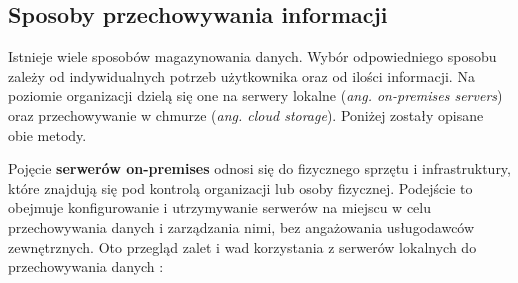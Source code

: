 \documentclass[12pt,a4paper,twoside]{article}
\begin{document}
\subsection{Sposoby przechowywania informacji}
Istnieje wiele sposobów magazynowania danych. Wybór odpowiedniego sposobu zależy od indywidualnych potrzeb użytkownika oraz od ilości informacji. Na poziomie organizacji dzielą się one na serwery lokalne (\textit{ang. on-premises servers}) oraz przechowywanie w chmurze (\textit{ang. cloud storage}). Poniżej zostały opisane obie metody.\par
Pojęcie \textbf{serwerów on-premises} odnosi się do fizycznego sprzętu i infrastruktury, które znajdują się pod kontrolą organizacji lub osoby fizycznej. Podejście to obejmuje konfigurowanie i utrzymywanie serwerów na miejscu w celu przechowywania danych i zarządzania nimi, bez angażowania usługodawców zewnętrznych. Oto przegląd zalet i wad korzystania z serwerów lokalnych do przechowywania danych \cite{F2023}:
\end{document}
